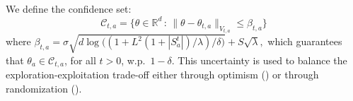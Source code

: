We define the confidence set:
\begin{equation}
\label{eq:confidence.intervals}
\mathcal{C}_{t,a} = \Big\{ \theta \in \mathbb{R}^d \,:\, \big\|\theta - \widehat{\theta}_{t,a} \big\|_{V_{t,a}} \leq \beta_{t,a} \Big\}
\end{equation}
 where 
        $\beta_{t,a} = \sigma\sqrt{d\log\big( (1 + L^2(1+|S_a^t|)/\lambda)/\delta \big)} + S\sqrt{\lambda},$
which guarantees that $\theta_{a}\in \mathcal{C}_{t,a}$, for all $t>0$, w.p.\ $1-\delta$.
%
This uncertainty is used to balance the exploration-exploitation trade-off either through optimism (\eg \linucb) or through randomization (\eg \lints). 






